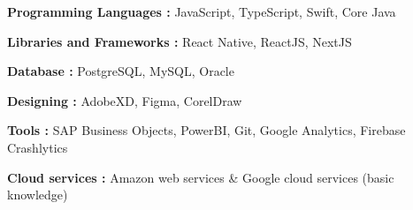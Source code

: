 


\begin{itemize}
\small{
    \item \textbf{Programming Languages : }JavaScript, TypeScript, Swift, Core Java
    \item \textbf{Libraries and Frameworks : }React Native, ReactJS, NextJS
    \item \textbf{Database : }PostgreSQL, MySQL, Oracle
    \item \textbf{Designing : }AdobeXD, Figma, CorelDraw
    \item \textbf{Tools : }SAP Business Objects, PowerBI, Git, Google Analytics, Firebase Crashlytics
    \item \textbf{Cloud services : }Amazon web services \& Google cloud services (basic knowledge)
    }
\end{itemize}